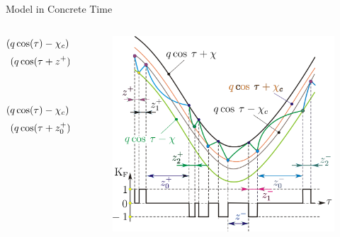 \begin{frame}{Model in Concrete Time}
	\vspace{-1em}
	\begin{columns}
		\begin{column}{.6 \textwidth}
			\begin{align*}
				(q \cos(\tau) - \chi_{c}) \cdot e^{z^{+}}                      = q \cos(\tau + z^{+}) - \chi_{0}            \\
				(q \cos(\tau + z^{+}) - \chi_{0} - 1) \cdot e^{z_{1}^{+}}      + 1  =                                \qquad \\
				q \cos(\tau + z^{+} + z_{1}^{+}) - \chi_{c}                                                                 \\\\
				(q \cos(\tau) - \chi_{c}) \cdot e^{z_{0}^{+}}                  = q \cos(\tau + z_{0}^{+}) + \chi_{0}        \\
				(q \cos(\tau + z_{0}^{+}) + \chi_{0} + 1) \cdot e^{z_{2}^{+}}  - 1  =                               \qquad  \\
				\hfill q \cos(\tau + z^{+} + z_{2}^{+}) + \chi_{c}
			\end{align*}
		\end{column}
		\begin{column}{.4 \textwidth}
			\begin{figure}
				\includegraphics[width=0.9 \textwidth]{Figs/discrete_model_derivation.png}
			\end{figure}
		\end{column}
	\end{columns}

	\flushright{[Avrutin]}
\end{frame}

